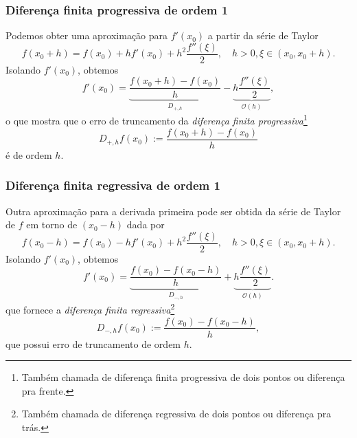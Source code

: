 \subsubsection{Diferença finita progressiva de ordem 1}
Podemos obter uma aproximação para $f'(x_0)$ a partir da série de Taylor
\begin{equation}
  f(x_0+h) = f(x_0) + hf'(x_0) + h^2\frac{f''(\xi)}{2},\quad h>0, \xi\in(x_0,x_0+h).
\end{equation}
Isolando $f'(x_0)$, obtemos
\begin{equation}\label{eq:dp_trunc}
  f'(x_0) = \underbrace{\frac{f(x_0+h) - f(x_0)}{h}}_{D_{+,h}} - \underbrace{h\frac{f''(\xi)}{2}}_{\mathcal{O}(h)},
\end{equation}
o que mostra que o erro de truncamento da \emph{diferença finita progressiva}\footnote{Também chamada de diferença finita progressiva de dois pontos ou diferença pra frente.}
\begin{equation}
  D_{+,h}f(x_0) := \frac{f(x_0+h)-f(x_0)}{h}
\end{equation}
é de ordem $h$.

\subsubsection{Diferença finita regressiva de ordem 1}
Outra aproximação para a derivada primeira pode ser obtida da série de Taylor de $f$ em torno de $(x_0-h)$ dada por
\begin{equation}
  f(x_0-h) = f(x_0) - hf'(x_0) + h^2\frac{f''(\xi)}{2},\quad h>0, \xi\in(x_0, x_0+h).
\end{equation}
Isolando $f'(x_0)$, obtemos
\begin{equation}
  f'(x_0) = \underbrace{\frac{f(x_0) - f(x_0-h)}{h}}_{D_{-,h}} + \underbrace{h\frac{f''(\xi)}{2}}_{\mathcal{O}(h)}.
\end{equation}
que fornece a \emph{diferença finita regressiva}\footnote{Também chamada de diferença regressiva de dois pontos ou diferença pra trás.}
\begin{equation}
  D_{-,h}f(x_0) := \frac{f(x_0)-f(x_0-h)}{h},
\end{equation}
que possui erro de truncamento de ordem $h$.

